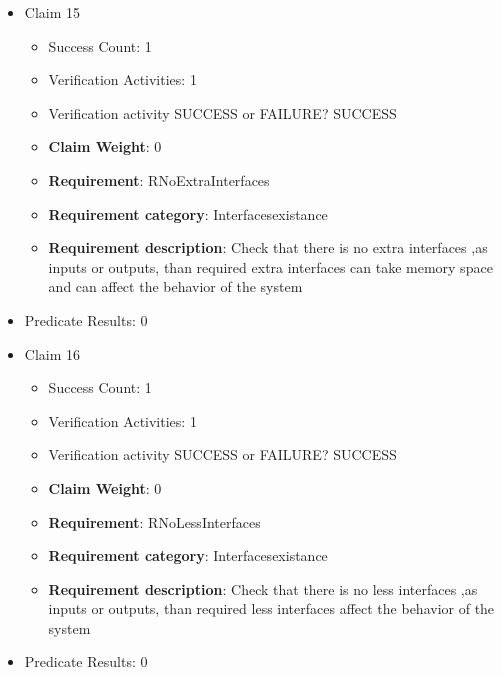 \documentclass{article}
\begin{document}
\begin{itemize}
  				  \item Claim 15
				\begin{itemize}
			    	\item Success Count: 1 
			    	\item Verification Activities: 1
					\item Verification activity SUCCESS or FAILURE? SUCCESS
					\item \textbf{Claim Weight}: 0
						\item \textbf{Requirement}: RNoExtraInterfaces 
						\item \textbf{Requirement category}: Interfacesexistance 
						\item \textbf{Requirement description}: Check that there is no extra interfaces ,as inputs or outputs, than required  extra interfaces can take memory space and can affect the behavior of the system
					
				\end{itemize}
				
									    
				\item Predicate Results: 0

  				  \item Claim 16
				\begin{itemize}
			    	\item Success Count: 1 
			    	\item Verification Activities: 1
					\item Verification activity SUCCESS or FAILURE? SUCCESS
					\item \textbf{Claim Weight}: 0
						\item \textbf{Requirement}: RNoLessInterfaces 
						\item \textbf{Requirement category}: Interfacesexistance 
						\item \textbf{Requirement description}: Check that there is no less interfaces ,as inputs or outputs, than required  less interfaces affect the behavior of the system
					
				\end{itemize}
				
									    
				\item Predicate Results: 0


\end{itemize}
\end{document}
